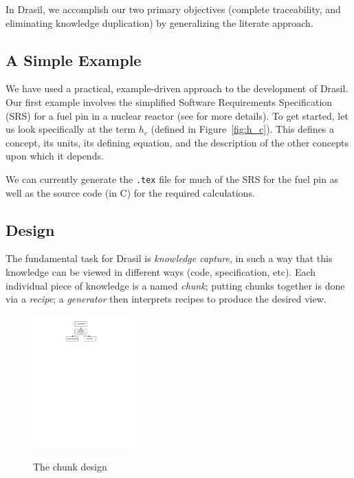 \documentclass{sig-alternate-05-2015}
\newcommand{\lss}{Drasil}
\begin{document}
In \lss, we accomplish our two primary objectives (complete traceability, and
eliminating knowledge duplication) by generalizing the literate approach.

\subsection{A Simple Example} \label{ssec:example}

We have used a practical, example-driven approach to the development of \lss{}.
Our first example involves 
the simplified Software Requirements Specification (SRS) for a fuel pin in a
nuclear reactor (see \cite{SmithAndKoothoor2016} for more details). To get
started, let us look specifically at the term $h_c$ (defined in
Figure~\ref{fig:h_c}).  This defines a concept, its units, its
defining equation, and the description of the other concepts upon which it
depends.

We can currently generate the \verb|.tex| file for
much of the SRS for the fuel pin as well as the source code (in C) for the
required calculations.

\subsection{Design} \label{sssec:ex_how}

The fundamental task for \lss{} is \emph{knowledge capture}, in such a 
way that this knowledge can be viewed in different ways (code, specification,
etc).  Each individual piece of knowledge is a named \textit{chunk}; putting
chunks together is done via a \textit{recipe}; a \textit{generator} then
interprets recipes to produce the desired view.  

\begin{figure}
\begin{center}
{
 \includegraphics[width=0.35\textwidth]{ChunkHierarchy.pdf}
}
\end{center}
\caption{The chunk design}
\label{fig:chunks}
\end{figure}
\end{document}
